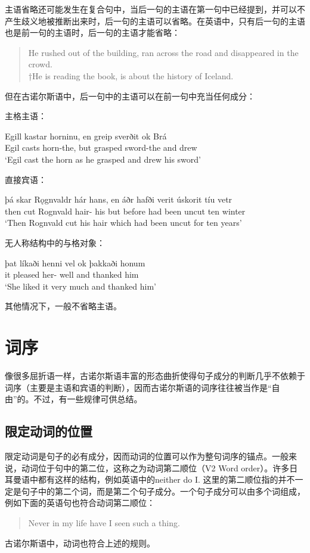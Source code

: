 \begin{enumerate}
主语省略还可能发生在复合句中，当后一句的主语在第一句中已经提到，并可以不产生歧义地被推断出来时，后一句的主语可以省略。在英语中，只有后一句的主语也是前一句的主语时，后一句的主语才能省略：
\begin{quote}
    He rushed out of the building, ran across the road and disappeared in the crowd.\\
    †He is reading the book, is about the history of Iceland.
\end{quote}

但在古诺尔斯语中，后一句中的主语可以在前一句中充当任何成分：

主格主语：
\begin{exe}
    \ex \gll Egill	kastar	horninu,	en	greip	sverðit	ok	Brá\\
Egil	casts	horn-the,	but	grasped	sword-the	and	drew\\

    \trans `Egil cast the horn as he grasped and drew his sword’
\end{exe}

直接宾语：
\begin{exe}
    \ex \gll þá	skar	Rǫgnvaldr	hár	hans,	en	áðr	hafði verit	úskorit	tíu	vetr\\	
then	cut	Rognvald	hair-{\acc}	his	but	before	had been	uncut	ten	winter	\\		 \trans`Then Rognvald cut his hair which had been uncut for ten years’
\end{exe}

无人称结构中的与格对象：
\begin{exe}
    \ex \gll þat	líkaði	henni	vel	ok	þakkaði	honum\\
it	pleased	her-{\dat}	well	and	thanked	him\\
\trans `She liked it very much and thanked him’
\end{exe}

其他情况下，一般不省略主语。

\end{enumerate}

\section{词序}
像很多屈折语一样，古诺尔斯语丰富的形态曲折使得句子成分的判断几乎不依赖于词序（主要是主语和宾语的判断），因而古诺尔斯语的词序往往被当作是“自由”的。不过，有一些规律可供总结。

\subsection{限定动词的位置}
限定动词是句子的必有成分，因而动词的位置可以作为整句词序的锚点。一般来说，动词位于句中的第二位，这称之为动词第二顺位（V2 Word order）。许多日耳曼语中都有这样的结构，例如英语中的neither do I. 这里的第二顺位指的并不一定是句子中的第二个词，而是第二个句子成分。一个句子成分可以由多个词组成，例如下面的英语句也符合动词第二顺位：
\begin{quote}
    Never in my life have I seen such a thing.
\end{quote}
古诺尔斯语中，动词也符合上述的规则。
